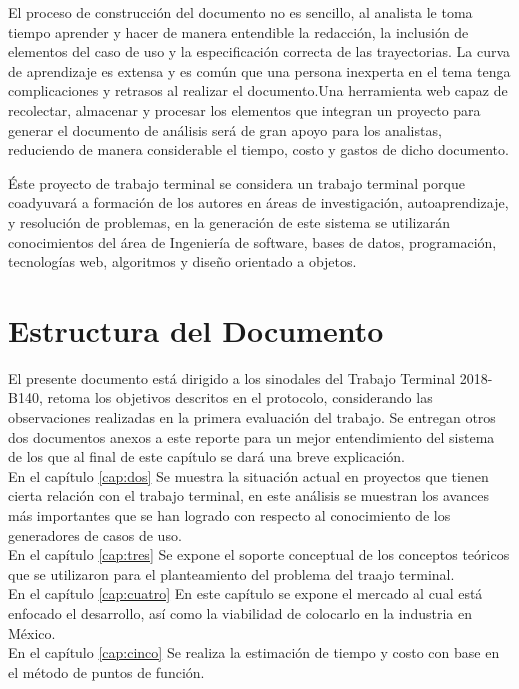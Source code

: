 El proceso de construcción del documento no es sencillo, al analista le toma tiempo aprender y hacer de manera entendible la redacción, la inclusión de elementos del caso de uso y la especificación correcta de las trayectorias. La curva de aprendizaje es extensa y es común que una persona inexperta en el tema tenga complicaciones y retrasos al realizar el documento.Una herramienta web capaz de recolectar, almacenar y procesar los elementos que integran un proyecto para generar el documento de análisis será de gran apoyo para los analistas, reduciendo de manera considerable el tiempo, costo y gastos de dicho documento. 

Éste proyecto de trabajo terminal se considera un trabajo terminal porque coadyuvará a formación de los autores en áreas de investigación, autoaprendizaje, y resolución de problemas,  en la generación de este sistema se utilizarán conocimientos del área de Ingeniería de software, bases de datos, programación, tecnologías web, algoritmos y diseño orientado a objetos.

\section{Estructura del Documento}

El presente documento está dirigido a los sinodales del Trabajo Terminal 2018-B140, retoma los objetivos descritos en el protocolo, considerando las observaciones realizadas en la primera evaluación del trabajo. Se entregan otros dos documentos anexos a este reporte para un mejor entendimiento del sistema de los que al final de este capítulo se dará una breve explicación.\\

En el capítulo  \ref{cap:dos} Se muestra la situación actual en proyectos que tienen cierta relación con el trabajo terminal, en este análisis se muestran los avances más importantes que se han logrado con respecto al conocimiento de los generadores de casos de uso.\\

En el capítulo  \ref{cap:tres} Se expone el soporte conceptual de los conceptos teóricos que se utilizaron para el planteamiento del problema del traajo terminal.\\

En el capítulo  \ref{cap:cuatro} En este capítulo se expone el mercado al cual está enfocado
el desarrollo, así como la viabilidad de colocarlo en la industria en México.\\

En el capítulo  \ref{cap:cinco} Se realiza la estimación de tiempo y costo con base en el método de puntos de función.\\